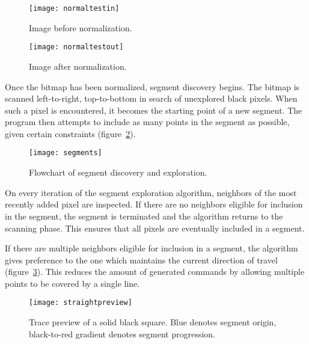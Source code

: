 \clearpage
\begin{figure}[ht]
    \centering
    \begin{minipage}{0.5\textwidth}
        \centering
        \texttt{[image: normaltestin]}
        \caption{Image before normalization.}
    \end{minipage}\hfill
    \begin{minipage}{0.5\textwidth}
        \centering
        \texttt{[image: normaltestout]}
        \caption{Image after normalization.}
        \label{normalize}
    \end{minipage}
\end{figure}

Once the bitmap has been normalized, segment discovery begins. The bitmap is
scanned left-to-right, top-to-bottom in search of unexplored black pixels.
When such a pixel is encountered, it becomes the starting point of a new
segment. The program then attempts to include as many points in the segment as
possible, given certain constraints (figure~\ref{segments}).

\begin{figure}[ht]
    \begin{center}
        \texttt{[image: segments]}
        \caption{Flowchart of segment discovery and exploration.}
        \label{segments}
    \end{center}
\end{figure}

On every iteration of the segment exploration algorithm, neighbors of the most
recently added pixel are inspected. If there are no neighbors eligible for
inclusion in the segment, the segment is terminated and the algorithm returns
to the scanning phase. This ensures that all pixels are eventually included in
a segment.

If there are multiple neighbors eligible for inclusion in a segment, the
algorithm gives preference to the one which maintains the current direction of
travel (figure~\ref{straight}). This reduces the amount of generated commands
by allowing multiple points to be covered by a single line.

\begin{figure}[ht]
    \begin{center}
        \texttt{[image: straightpreview]}
        \caption{Trace preview of a solid black square. Blue denotes segment
        origin, black-to-red gradient denotes segment progression.}
        \label{straight}
    \end{center}
\end{figure}


